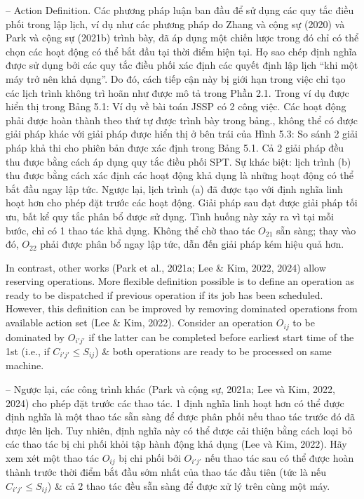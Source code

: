 \documentclass{article}
\begin{document}
\begin{itemize}
\begin{itemize}
        -- {\sf Action Definition.} Các phương pháp luận ban đầu để sử dụng các quy tắc điều phối trong lập lịch, ví dụ như các phương pháp do Zhang và cộng sự (2020) và Park và cộng sự (2021b) trình bày, đã áp dụng một chiến lược trong đó chỉ có thể chọn các hoạt động có thể bắt đầu tại thời điểm hiện tại. Họ sao chép định nghĩa được sử dụng bởi các quy tắc điều phối xác định các quyết định lập lịch ``khi một máy trở nên khả dụng''. Do đó, cách tiếp cận này bị giới hạn trong việc chỉ tạo các lịch trình không trì hoãn như được mô tả trong Phần 2.1. Trong ví dụ được hiển thị trong {\sf Bảng 5.1: Ví dụ về bài toán JSSP có 2 công việc. Các hoạt động phải được hoàn thành theo thứ tự được trình bày trong bảng.}, không thể có được giải pháp khác với giải pháp được hiển thị ở bên trái của {\sf Hình 5.3: So sánh 2 giải pháp khả thi cho phiên bản được xác định trong Bảng 5.1. Cả 2 giải pháp đều thu được bằng cách áp dụng quy tắc điều phối SPT. Sự khác biệt: lịch trình (b) thu được bằng cách xác định các hoạt động khả dụng là những hoạt động có thể bắt đầu ngay lập tức. Ngược lại, lịch trình (a) đã được tạo với định nghĩa linh hoạt hơn cho phép đặt trước các hoạt động. Giải pháp sau đạt được giải pháp tối ưu}, bất kể quy tắc phân bổ được sử dụng. Tình huống này xảy ra vì tại mỗi bước, chỉ có 1 thao tác khả dụng. Không thể chờ thao tác $O_{21}$ sẵn sàng; thay vào đó, $O_{22}$ phải được phân bổ ngay lập tức, dẫn đến giải pháp kém hiệu quả hơn.

        In contrast, other works (Park et al., 2021a; Lee \& Kim, 2022, 2024) allow reserving operations. More flexible definition possible is to define an operation as ready to be dispatched if previous operation if its job has been scheduled. However, this definition can be improved by removing dominated operations from available action set (Lee \& Kim, 2022). Consider an operation $O_{ij}$ to be dominated by $O_{i'j'}$ if the latter can be completed before earliest start time of the 1st (i.e., if $C_{i'j'}\le S_{ij}$) \& both operations are ready to be processed on same machine.

        -- Ngược lại, các công trình khác (Park và cộng sự, 2021a; Lee và Kim, 2022, 2024) cho phép đặt trước các thao tác. 1 định nghĩa linh hoạt hơn có thể được định nghĩa là một thao tác sẵn sàng để được phân phối nếu thao tác trước đó đã được lên lịch. Tuy nhiên, định nghĩa này có thể được cải thiện bằng cách loại bỏ các thao tác bị chi phối khỏi tập hành động khả dụng (Lee và Kim, 2022). Hãy xem xét một thao tác $O_{ij}$ bị chi phối bởi $O_{i'j'}$ nếu thao tác sau có thể được hoàn thành trước thời điểm bắt đầu sớm nhất của thao tác đầu tiên (tức là nếu $C_{i'j'}\le S_{ij}$) \& cả 2 thao tác đều sẵn sàng để được xử lý trên cùng một máy.


\end{itemize}
\end{itemize}
\end{document}
